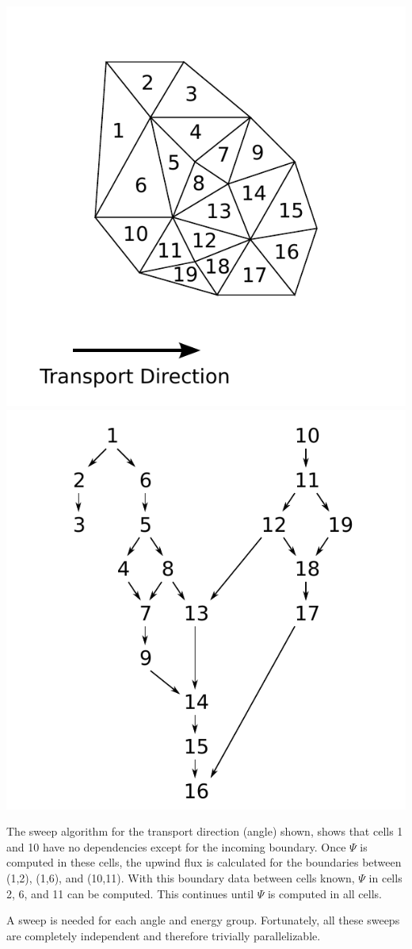 \documentclass[12pt,letterpaper]{article}
\begin{document}
\includegraphics[scale=0.75]{grid2d.pdf}
\includegraphics[scale=0.75]{dag.pdf}

The sweep algorithm for the transport direction (angle) shown, shows that cells 1 and 10 have no dependencies except for the incoming boundary.
Once $\Psi$ is computed in these cells, the upwind flux is calculated for the boundaries between (1,2), (1,6), and (10,11).
With this boundary data between cells known, $\Psi$ in cells 2, 6, and 11 can be computed.
This continues until $\Psi$ is computed in all cells.

A sweep is needed for each angle and energy group.
Fortunately, all these sweeps are completely independent and therefore trivially parallelizable.
\end{document}
